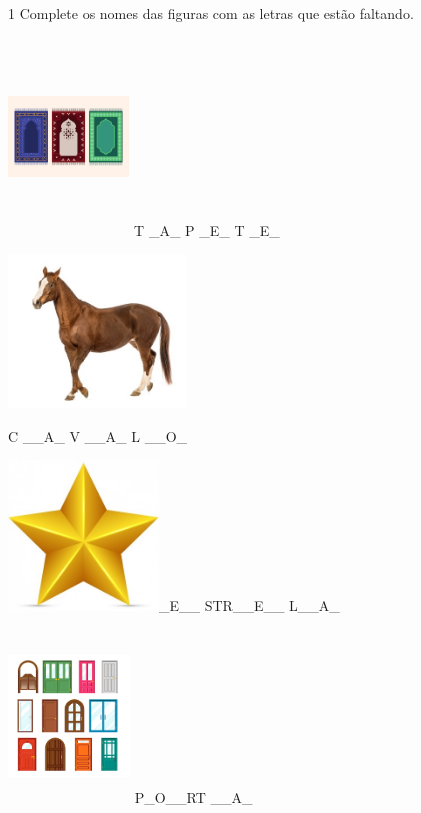 
\num{1} Complete os nomes das figuras com as letras que estão faltando.

\includegraphics[width=1.26518in,height=2.06178in]{media/image1.jpeg} T
\_A\_ P \_E\_ T \_E\_

\includegraphics[width=1.85417in,height=1.60240in]{media/image2.jpeg}

C \_\_A\_ V \_\_A\_ L \_\_O\_

\includegraphics[width=1.57292in,height=1.57292in]{media/image3.jpeg}\_E\_\_
STR\_\_E\_\_ L\_\_A\_

\includegraphics[width=1.27083in,height=1.80035in]{media/image4.jpeg}
P\_O\_\_RT \_\_A\_

